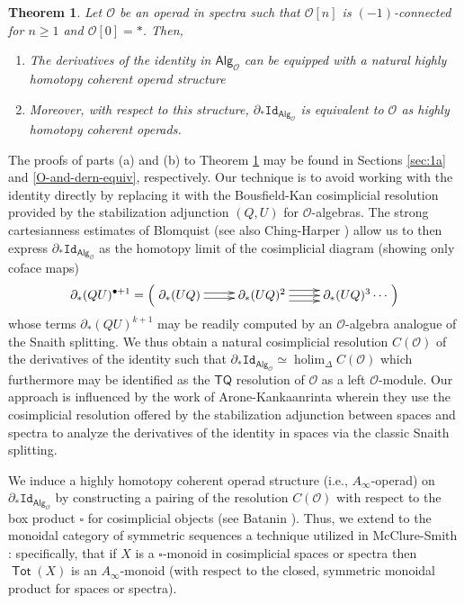\documentclass[11pt]{amsart}
\newtheorem{theorem}[subsection]{Theorem}
\theoremstyle{definition}
\theoremstyle{remark}
\newcommand{\TQ}{\mathsf{TQ}}
\newcommand{\Tot}{\operatorname{\mathsf{Tot}}}
\newcommand{\holim}{\operatorname{holim}}
\newcommand{\Alg}[1]{ {\mathsf{Alg}_{\mathcal{#1}}} }
\newcommand{\Id}{\mathtt{Id}}
\newcommand{\pt}{*}
\newcommand{\Cal}[1]{\mathcal{#1}}
\begin{document}
\begin{theorem} \label{main} Let $\Cal{O}$ be an operad in spectra such that $\Cal{O}[n]$ is $(-1)$-connected for $n\geq 1$ and $\Cal{O}[0]=\pt$. Then,
    \begin{enumerate}[label=(\alph*)]
        \item The derivatives of the identity in $\Alg{O}$ can be equipped with a natural highly homotopy coherent operad structure
        \item Moreover, with respect to this structure, $\partial_* \Id_{\Alg{O}}$ is equivalent to $\Cal{O}$ as highly homotopy coherent operads. 
    \end{enumerate}
\end{theorem}

The proofs of parts (a) and (b) to Theorem \ref{main} may be found in Sections \ref{sec:1a} and \ref{O-and-dern-equiv}, respectively. Our technique is to avoid working with the identity directly by replacing it with the Bousfield-Kan cosimplicial resolution provided by the stabilization adjunction $(Q,U)$ for $\Cal{O}$-algebras. The strong cartesianness estimates of Blomquist \cite{Blom} (see also Ching-Harper \cite{Ching-Harper-BM}) allow us to then express $\partial_* \Id_{\Alg{O}}$ as the homotopy limit of the cosimplicial diagram (showing only coface maps) \begin{equation} \label{eq:der-model-stab} \partial_*(QU)^{\bullet+1}=  \left(\xymatrix{
    \partial_*(UQ) \ar@<-.5ex>[r] \ar@<.5ex>[r] &
    \partial_*(UQ)^2 \ar@<-1ex>[r] \ar[r] \ar@<1ex>[r] &
    \partial_*(UQ)^3  \cdots 
}\right)\end{equation}
whose terms $\partial_*(QU)^{k+1}$ may be readily computed by an $\Cal{O}$-algebra analogue of the Snaith splitting. We thus obtain a natural cosimplicial resolution $C(\Cal{O})$ of the derivatives of the identity such that $\partial_* \Id_{\Alg{O}}\simeq \holim_{\Delta} C(\Cal{O})$ which furthermore may be identified as the $\TQ$ resolution of $\Cal{O}$ as a left $\Cal{O}$-module. Our approach is influenced by the work of Arone-Kankaanrinta \cite{AK} wherein they use the cosimplicial resolution offered by the stabilization adjunction between spaces and spectra to analyze the derivatives of the identity in spaces via the classic Snaith splitting. 

We induce a highly homotopy coherent operad structure (i.e., $A_{\infty}$-operad) on $\partial_* \Id_{\Alg{O}}$ by constructing a pairing of the resolution $C(\Cal{O})$ with respect to the box product $\square$ for cosimplicial objects (see Batanin \cite{Bat-box}). Thus, we extend to the monoidal category of symmetric sequences a technique utilized in McClure-Smith \cite{MS-box}: specifically, that if $X$ is a $\square$-monoid in cosimplicial spaces or spectra then $\Tot(X)$ is an $A_{\infty}$-monoid (with respect to the closed, symmetric monoidal product for spaces or spectra).
\end{document}
